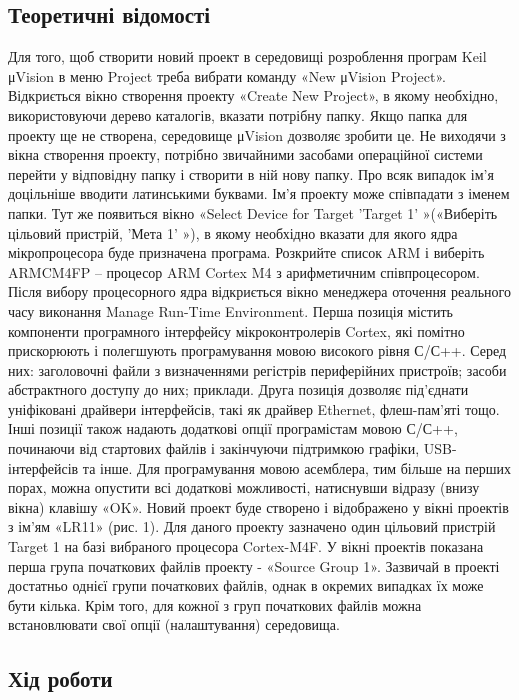 \documentclass[12pt]{extarticle}
\begin{document}
\subsection*{Теоретичні відомості}
Для того, щоб створити новий проект в середовищі розроблення програм Keil
μVision в меню Project треба вибрати команду «New μVision Project». Відкриється вікно
створення проекту «Create New Project», в якому необхідно, використовуючи дерево
каталогів, вказати потрібну папку. Якщо папка для проекту ще не створена, середовище
μVision дозволяє зробити це. Не виходячи з вікна створення проекту, потрібно
звичайними засобами операційної системи перейти у відповідну папку і створити в ній
нову папку. Про всяк випадок ім’я доцільніше вводити латинськими буквами. Ім’я
проекту може співпадати з іменем папки.
Тут же появиться вікно «Select Device for Target 'Target 1' »(«Виберіть цільовий
пристрій, 'Мета 1' »), в якому необхідно вказати для якого ядра мікропроцесора буде
призначена програма. Розкрийте список ARM і виберіть ARMCM4FP – процесор ARM
Cortex M4 з арифметичним співпроцесором.
Після вибору процесорного ядра відкриється вікно менеджера оточення реального
часу виконання Manage Run-Time Environment. Перша позиція містить компоненти
програмного інтерфейсу мікроконтролерів Cortex, які помітно прискорюють і
полегшують програмування мовою високого рівня С/С++. Серед них: заголовочні
файли з визначеннями регістрів периферійних пристроїв; засоби абстрактного доступу
до них; приклади. Друга позиція дозволяє під'єднати уніфіковані драйвери інтерфейсів,
такі як драйвер Ethernet, флеш-пам'яті тощо. Інші позиції також надають додаткові опції
програмістам мовою С/С++, починаючи від стартових файлів і закінчуючи підтримкою
графіки, USB-інтерфейсів та інше.
Для програмування мовою асемблера, тим більше на перших порах, можна
опустити всі додаткові можливості, натиснувши відразу (внизу вікна) клавішу «OK».
Новий проект буде створено і відображено у вікні проектів з ім'ям «LR11» (рис. 1). Для
даного проекту зазначено один цільовий пристрій Target 1 на базі вибраного процесора
Cortex-M4F. У вікні проектів показана перша група початкових файлів проекту - «Source
Group 1». Зазвичай в проекті достатньо однієї групи початкових файлів, однак в окремих
випадках їх може бути кілька. Крім того, для кожної з груп початкових файлів можна
встановлювати свої опції (налаштування) середовища.
\subsection*{Хід роботи}
\end{document}
